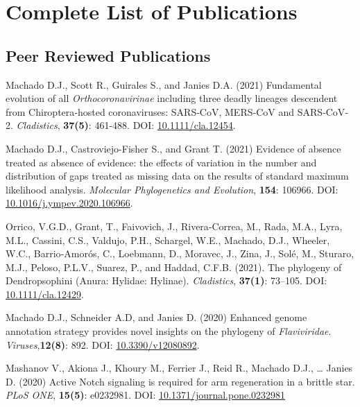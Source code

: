 
\section{Complete List of Publications}

\subsection{Peer Reviewed Publications}

	{
		\setlength{\parskip}{.5em}\renewcommand{\baselinestretch}{2.0}
		\begin{hangparas}{.25in}{1}


		Machado D.J., Scott R., Guirales S., and Janies D.A. (2021) Fundamental evolution of all \emph{Orthocoronavirinae} including three deadly lineages descendent from Chiroptera‐hosted coronaviruses: SARS‐CoV, MERS‐CoV and SARS‐CoV‐2. \emph{Cladistics}, \textbf{37(5)}: 461-488. DOI: \href{https://doi.org/10.1111/cla.12454}{10.1111/cla.12454}.

		Machado D.J., Castroviejo-Fisher S., and Grant T. (2021) Evidence of absence treated as absence of evidence: the effects of variation in the number and distribution of gaps treated as missing data on the results of standard maximum likelihood analysis. \emph{Molecular Phylogenetics and Evolution}, \textbf{154}: 106966. DOI: \href{https://doi.org/10.1016/j.ympev.2020.106966}{10.1016/j.ympev.2020.106966}.

        Orrico, V.G.D., Grant, T., Faivovich, J., Rivera‐Correa, M., Rada, M.A., Lyra, M.L., Cassini, C.S., Valdujo, P.H., Schargel, W.E., Machado, D.J., Wheeler, W.C., Barrio‐Amorós, C., Loebmann, D., Moravec, J., Zina, J., Solé, M., Sturaro, M.J., Peloso, P.L.V., Suarez, P., and Haddad, C.F.B. (2021). The phylogeny of Dendropsophini (Anura: Hylidae: Hylinae). \emph{Cladistics}, \textbf{37(1)}: 73–105. DOI: \href{https://doi.org/10.1111/cla.12429}{10.1111/cla.12429}.


        Machado D.J., Schneider A.D, and Janies D. (2020) Enhanced genome annotation strategy provides novel insights on the phylogeny of \emph{Flaviviridae}. \emph{Viruses},\textbf{12(8)}: 892. DOI: \href{https://www.mdpi.com/1999-4915/12/8/892}{10.3390/v12080892}.

	    Mashanov V., Akiona J., Khoury M., Ferrier J., Reid R., Machado D.J., … Janies D. (2020) Active Notch signaling is required for arm regeneration in a brittle star. \emph{PLoS ONE}, \textbf{15(5)}: e0232981. DOI: \href{https://doi.org/10.1371/journal.pone.0232981}{10.1371/journal.pone.0232981}


\end{hangparas}}
